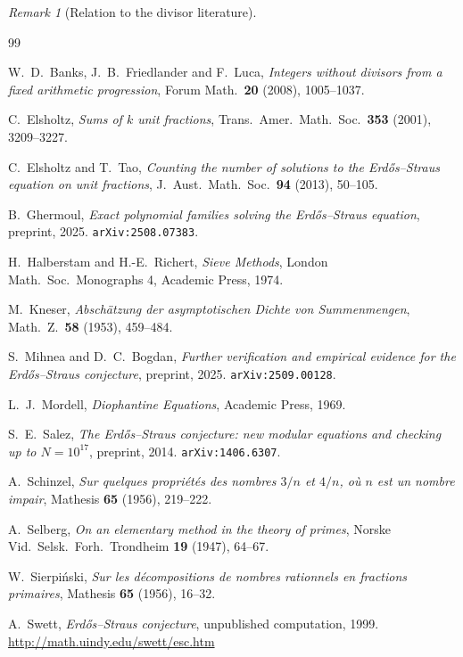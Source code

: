 \documentclass[12pt]{amsart}
\theoremstyle{definition}
\theoremstyle{remark}
\newtheorem{remark}[theorem]{Remark}
\begin{document}
\begin{remark}[Relation to the divisor literature]
\begin{thebibliography}{99}

W.~D.~Banks, J.~B.~Friedlander and F.~Luca,
\emph{Integers without divisors from a fixed arithmetic progression},
Forum Math.\ \textbf{20} (2008), 1005--1037.

C.~Elsholtz,
\emph{Sums of $k$ unit fractions},
Trans.\ Amer.\ Math.\ Soc.\ \textbf{353} (2001), 3209--3227.

C.~Elsholtz and T.~Tao,
\emph{Counting the number of solutions to the Erd\H{o}s--Straus equation on unit fractions},
J.\ Aust.\ Math.\ Soc.\ \textbf{94} (2013), 50--105.

B.~Ghermoul,
\emph{Exact polynomial families solving the Erd\H{o}s--Straus equation},
preprint, 2025. \texttt{arXiv:2508.07383}.

H.~Halberstam and H.-E.~Richert,
\emph{Sieve Methods},
London Math.\ Soc.\ Monographs 4, Academic Press, 1974.

M.~Kneser,
\emph{Absch\"atzung der asymptotischen Dichte von Summenmengen},
Math.\ Z.\ \textbf{58} (1953), 459--484.

S.~Mihnea and D.~C.~Bogdan,
\emph{Further verification and empirical evidence for the Erd\H{o}s--Straus conjecture},
preprint, 2025. \texttt{arXiv:2509.00128}.

L.~J.~Mordell,
\emph{Diophantine Equations},
Academic Press, 1969.

S.~E.~Salez,
\emph{The Erd\H{o}s--Straus conjecture: new modular equations and
checking up to $N = 10^{17}$},
preprint, 2014. \texttt{arXiv:1406.6307}.

A.~Schinzel,
\emph{Sur quelques propri\'et\'es des nombres $3/n$ et $4/n$,
o\`u $n$ est un nombre impair},
Mathesis \textbf{65} (1956), 219--222.

A.~Selberg,
\emph{On an elementary method in the theory of primes},
Norske Vid.\ Selsk.\ Forh.\ Trondheim \textbf{19} (1947), 64--67.

W.~Sierpi\'nski,
\emph{Sur les d\'ecompositions de nombres rationnels en fractions primaires},
Mathesis \textbf{65} (1956), 16--32.

A.~Swett,
\emph{Erd\H{o}s--Straus conjecture},
unpublished computation, 1999.
\url{http://math.uindy.edu/swett/esc.htm}


\end{thebibliography}
\end{remark}
\end{document}
